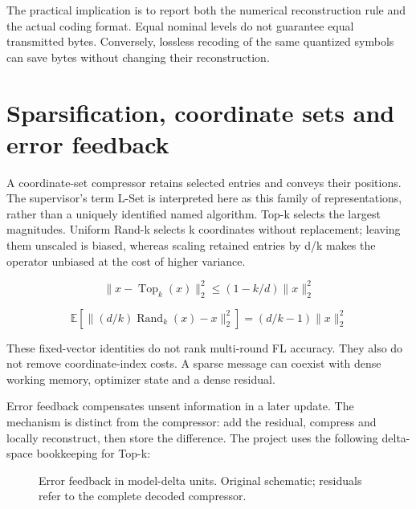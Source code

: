\documentclass[11pt,a4paper]{article}
\begin{document}
The practical implication is to report both the numerical reconstruction rule and the actual coding format. Equal nominal levels do not guarantee equal transmitted bytes. Conversely, lossless recoding of the same quantized symbols can save bytes without changing their reconstruction.

\section{Sparsification, coordinate sets and error feedback}

A coordinate-set compressor retains selected entries and conveys their positions. The supervisor's term L-Set is interpreted here as this family of representations, rather than a uniquely identified named algorithm. Top-k selects the largest magnitudes. Uniform Rand-k selects k coordinates without replacement; leaving them unscaled is biased, whereas scaling retained entries by d/k makes the operator unbiased at the cost of higher variance. \parencite{stich2018memory}

\begin{equation*}\|x-\operatorname{Top}_k(x)\|_2^2 \leq (1-k/d)\|x\|_2^2\end{equation*}

\begin{equation*}\mathbb{E}[\|(d/k)\operatorname{Rand}_k(x)-x\|_2^2] = (d/k-1)\|x\|_2^2\end{equation*}

These fixed-vector identities do not rank multi-round FL accuracy. They also do not remove coordinate-index costs. A sparse message can coexist with dense working memory, optimizer state and a dense residual.

Error feedback compensates unsent information in a later update. The mechanism is distinct from the compressor: add the residual, compress and locally reconstruct, then store the difference. The project uses the following delta-space bookkeeping for Top-k:

\begin{figure}[htbp]\centering
{}
\caption{Error feedback in model-delta units. Original schematic; residuals refer to the complete decoded compressor.}
\label{fig:ef}
\end{figure}
\end{document}
